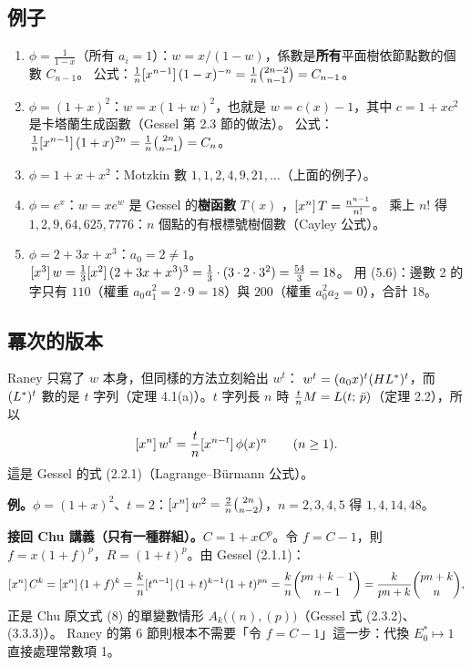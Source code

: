 \subsection{例子}

\begin{table}[H]
\centering
\footnotesize
\RanLagrangeTable
\caption{五個 $\phi$：「逐次代入」是直接解方程 (5.3) 得到的係數，「式 (5.5)」是 Lagrange 公式，兩者一致。}
\label{tab:lagrange}
\end{table}

\begin{enumerate}[leftmargin=1.6em]
  \item $\phi=\frac1{1-x}$（所有 $a_i=1$）：$w=x/(1-w)$，係數是\textbf{所有}平面樹依節點數的個數 $C_{n-1}$。
        公式：$\frac1n[x^{n-1}]\,(1-x)^{-n}=\frac1n\binom{2n-2}{n-1}=C_{n-1}$。
  \item $\phi=(1+x)^2$：$w=x(1+w)^2$，也就是 $w=c(x)-1$，其中 $c=1+xc^2$ 是卡塔蘭生成函數（Gessel 第 2.3 節的做法）。
        公式：$\frac1n[x^{n-1}]\,(1+x)^{2n}=\frac1n\binom{2n}{n-1}=C_n$。
  \item $\phi=1+x+x^2$：Motzkin 數 $1,1,2,4,9,21,\ldots$（上面的例子）。
  \item $\phi=e^x$：$w=xe^w$ 是 Gessel 的\textbf{樹函數} $T(x)$ ，$[x^n]\,T=\frac{n^{n-1}}{n!}$。
        乘上 $n!$ 得 $1,2,9,64,625,7776$：$n$ 個點的有根標號樹個數（Cayley 公式）。
  \item $\phi=2+3x+x^3$：$a_0=2\neq1$。$[x^3]\,w=\frac13[x^2]\,(2+3x+x^3)^3=\frac13\cdot(3\cdot2\cdot3^2)=\frac{54}{3}=18$。
        用 (5.6)：邊數 2 的字只有 $110$（權重 $a_0a_1^2=2\cdot9=18$）與 $200$（權重 $a_0^2a_2=0$），合計 18。
\end{enumerate}

\subsection{冪次的版本 \extra}

Raney 只寫了 $w$ 本身，但同樣的方法立刻給出 $w^t$：
$w^t=(a_0x)^t(HL^{*})^t$，而 $(L^{*})^t$ 數的是 $t$ 字列（定理 4.1(a)）。$t$ 字列長 $n$ 時 $\frac tnM=L(t;\,\bar p)$（定理 2.2），所以
\[
[x^n]\,w^t=\frac tn[x^{n-t}]\,\phi(x)^n\qquad(n\ge1).
\]
這是 Gessel 的式 (2.2.1)（Lagrange--Bürmann 公式）。

\textbf{例。}$\phi=(1+x)^2$、$t=2$：$[x^n]\,w^2=\frac2n\binom{2n}{n-2}$，$n=2,3,4,5$ 得 $1,4,14,48$。

\textbf{接回 Chu 講義（只有一種群組）。}$C=1+xC^p$。令 $f=C-1$，則 $f=x(1+f)^p$，$R=(1+t)^p$。由 Gessel (2.1.1)：
\[
[x^n]\,C^k=[x^n]\,(1+f)^k=\frac kn[t^{n-1}]\,(1+t)^{k-1}(1+t)^{pn}=\frac kn\binom{pn+k-1}{n-1}=\frac{k}{pn+k}\binom{pn+k}{n},
\]
正是 Chu 原文式 (8) 的單變數情形 $A_k\big((n),(p)\big)$（Gessel 式 (2.3.2)、(3.3.3)）。
Raney 的第 6 節則根本不需要「令 $f=C-1$」這一步：代換 $E_0^*\mapsto1$ 直接處理常數項 1。


